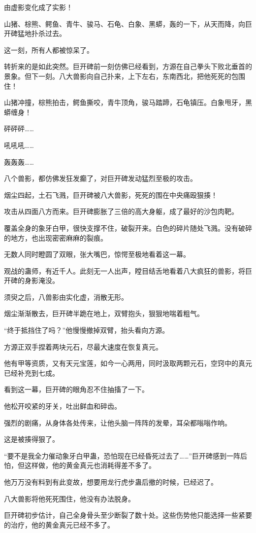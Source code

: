 \begin{this_body}
由虚影变化成了实影！

山猪、棕熊、鳄鱼、青牛、骏马、石龟、白象、黑蟒，轰的一下，从天而降，向巨开碑猛地扑杀过去。

这一刻，所有人都被惊呆了。

转折来的是如此突然。巨开碑前一刻仿佛已经看到，方源在自己拳头下败北垂首的景象。但下一刻。八大兽影向自己扑来，上下左右，东南西北，把他死死的包围住！

山猪冲撞，棕熊拍击，鳄鱼撕咬，青牛顶角，骏马踏蹄，石龟镇压。白象甩牙，黑蟒缠身！

砰砰砰……

吼吼吼……

轰轰轰……

八个兽影，都仿佛发狂发癫了，对巨开碑发动猛烈至极的攻击。

烟尘四起，土石飞溅，巨开碑被八大兽影，死死的围在中央痛殴狠揍！

攻击从四面八方而来。巨开碑膨胀了三倍的高大身躯，成了最好的沙包肉靶。

覆盖全身的象牙白甲，很快支撑不住，破裂开来。白色的碎片随处飞溅。没有破碎的地方，也出现密密麻麻的裂痕。

无数人同时瞪圆了双眼，张大嘴巴，惊愕至极地看着这一幕。

观战的蛊师，有近千人。此刻无一人出声，瞠目结舌地看着八大疯狂的兽影，将巨开碑的身影淹没。

须臾之后，八兽影由实化虚，消散无形。

烟尘渐渐散去，巨开碑半跪在地上，双臂抱头，狠狠地喘着粗气。

“终于抵挡住了吗？”他慢慢撤掉双臂，抬头看向方源。

方源正双手捏着两块元石，尽最大速度在恢复真元。

他有甲等资质，又有天元宝莲，如今一心两用，同时汲取两颗元石，空窍中的真元已经补充到七成。

看到这一幕，巨开碑的眼角忍不住抽搐了一下。

他松开咬紧的牙关，吐出鲜血和碎齿。

强烈的剧痛，从身体各处传来，让他头脑一阵阵的发晕，耳朵都嗡嗡作响。

这是被揍得狠了。

“要不是我全力催动象牙白甲蛊，恐怕现在已经昏死过去了……”巨开碑感到一阵后怕，但这样做，他的黄金真元也消耗得差不多了。

他万万没有料到有此变故，想要用龙行虎步蛊后撤的时候，已经迟了。

八大兽影将他死死围住，他没有办法脱身。

巨开碑初步估计，自己全身骨头至少断裂了数十处。这些伤势他只能选择一些紧要的治疗，他的黄金真元已经不多了。


\end{this_body}

